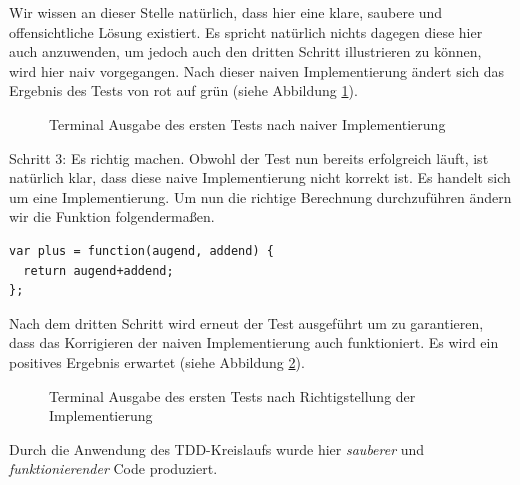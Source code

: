 Wir wissen an dieser Stelle natürlich, dass hier eine klare, saubere und offensichtliche Lösung existiert. Es spricht natürlich nichts dagegen diese hier auch anzuwenden, um jedoch auch den dritten Schritt illustrieren zu können, wird hier naiv vorgegangen.\newline
Nach dieser naiven Implementierung ändert sich das Ergebnis des Tests von rot auf grün (siehe Abbildung \ref{figure:tdd-simple-step-1-2}).

\begin{figure}[H]
  \centering
  \caption{Terminal Ausgabe des ersten Tests nach naiver Implementierung}
  \label{figure:tdd-simple-step-1-2}
\end{figure}

Schritt 3: Es richtig machen.
Obwohl der Test nun bereits erfolgreich läuft, ist natürlich klar, dass diese naive Implementierung nicht korrekt ist. Es handelt sich um eine  Implementierung. Um nun die richtige Berechnung durchzuführen ändern wir die  Funktion folgendermaßen.

\begin{lstlisting}[style=verbo]
var plus = function(augend, addend) {
  return augend+addend;
};
\end{lstlisting}

Nach dem dritten Schritt wird erneut der Test ausgeführt um zu garantieren, dass das Korrigieren der naiven Implementierung auch funktioniert. Es wird ein positives Ergebnis erwartet (siehe Abbildung \ref{figure:tdd-simple-step-1-3}).

\begin{figure}[H]
  \centering
  \caption{Terminal Ausgabe des ersten Tests nach Richtigstellung der Implementierung}
  \label{figure:tdd-simple-step-1-3}
\end{figure}

Durch die Anwendung des TDD-Kreislaufs wurde hier \textit{sauberer} und \textit{funktionierender} Code produziert.


